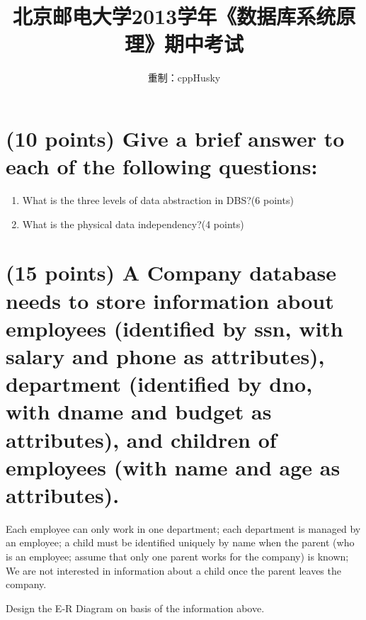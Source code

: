 \documentclass{ctexart}
\title{\bfseries\sffamily 北京邮电大学2013学年《数据库系统原理》期中考试}
\author{重制：cppHusky}
\date{}
\begin{document}
\maketitle
\section{(10 points) Give a brief answer to each of the following questions:}
\begin{enumerate}[label=\arabic*)]
    \item What is the three levels of data abstraction in DBS?\quad(6 points)
    \item What is the physical data independency?\quad(4 points)
\end{enumerate}\par
\section{(15 points) A Company database needs to store information about employees (identified by ssn, with salary and phone as attributes), department (identified by dno, with dname and budget as attributes), and children of employees (with name and age as attributes).}
Each employee can only work in one department; each department is managed by an employee; a child must be identified uniquely by name when the parent (who is an employee; assume that only one parent works for the company) is known; We are not interested in information about a child once the parent leaves the company.\par
Design the E-R Diagram on basis of the information above.\par
\end{document}
